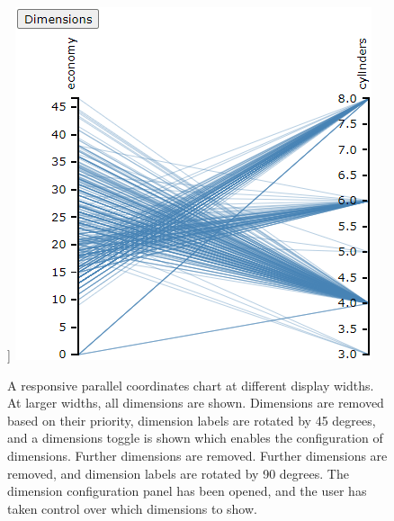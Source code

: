 \begin{figure}[tp]
]
{%
\includegraphics[valign=b,scale=\respparcoordscale]
{images/resp-parcoord-4.png}%
\label{fig:RespParCoordExample4}%
}
\hfill
{}
\caption[Responsive Parallel Coordinates Chart Example]
{
A responsive parallel coordinates chart at different display widths.
 At larger widths, all dimensions are
shown.  Dimensions are removed based
on their priority, dimension labels are rotated by 45 degrees, and a
dimensions toggle is shown which enables the configuration of
dimensions.  Further dimensions are
removed.  Further dimensions are
removed, and dimension labels are rotated by 90 degrees.
 The dimension configuration panel
has been opened, and the user has taken control over which dimensions
to show.
}
\label{fig:RespParCoordExample}
\end{figure}

